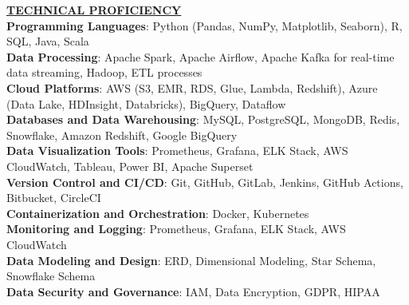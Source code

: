 \documentclass{article}
\begin{document}
\vspace{2mm}
\noindent \textbf{\underline{TECHNICAL PROFICIENCY}} \\
\textbf{Programming Languages}{: \small Python (Pandas, NumPy, Matplotlib, Seaborn), R, SQL, Java, Scala} \\
\textbf{Data Processing}{: \small Apache Spark, Apache Airflow, Apache Kafka for real-time data streaming, Hadoop, ETL processes} \\
\textbf{Cloud Platforms}{: \small AWS (S3, EMR, RDS, Glue, Lambda, Redshift), Azure (Data Lake, HDInsight, Databricks), BigQuery, Dataflow} \\
\textbf{Databases and Data Warehousing}{: \small MySQL, PostgreSQL, MongoDB, Redis, Snowflake, Amazon Redshift, Google BigQuery} \\
\textbf{Data Visualization Tools}{: \small Prometheus, Grafana, ELK Stack, AWS CloudWatch, Tableau, Power BI, Apache Superset} \\
\textbf{Version Control and CI/CD}{: \small Git, GitHub, GitLab, Jenkins, GitHub Actions, Bitbucket, CircleCI} \\
\textbf{Containerization and Orchestration}{: \small Docker, Kubernetes} \\
\textbf{Monitoring and Logging}{: \small Prometheus, Grafana, ELK Stack, AWS CloudWatch} \\
\textbf{Data Modeling and Design}{: \small ERD, Dimensional Modeling, Star Schema, Snowflake Schema} \\
\textbf{Data Security and Governance}{: \small IAM, Data Encryption, GDPR, HIPAA}
\vspace{2mm}
\end{document}
